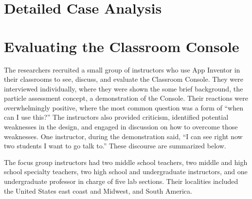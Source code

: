 \section{Detailed Case Analysis}
%
%


\section{Evaluating the Classroom Console}
The researchers recruited a small group of instructors who use App Inventor in their classrooms to see, discuss, and evaluate the Classroom Console. They were interviewed individually, where they were shown the some brief background, the particle assessment concept, a demonstration of the Console. Their reactions were overwhelmingly positive, where the most common question was a form of ``when can I use this?'' The instructors also provided criticism, identified potential weaknesses in the design, and engaged in discussion on how to overcome those weaknesses. One instructor, during the demonstration said, ``I can see right now two students I want to go talk to.'' These discourse are summarized below.

The focus group instructors had two middle school teachers, two middle and high school specialty teachers, two high school and undergraduate instructors, and one undergraduate professor in charge of five lab sections. Their localities included the United States east coast and Midwest, and South America. 

